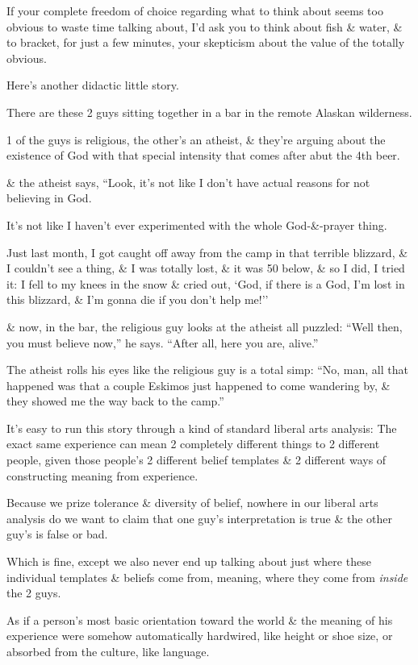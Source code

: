\documentclass{article}
\numberwithin{equation}{section}
\begin{document}
If your complete freedom of choice regarding what to think about seems too obvious to waste time talking about, I'd ask you to think about fish \& water, \& to bracket, for just a few minutes, your skepticism about the value of the totally obvious.

Here's another didactic little story.

There are these 2 guys sitting together in a bar in the remote Alaskan wilderness.

1 of the guys is religious, the other's an atheist, \& they're arguing about the existence of God with that special intensity that comes after abut the 4th beer.

\& the atheist says, ``Look, it's not like I don't have actual reasons for not believing in God.

It's not like I haven't ever experimented with the whole God-\&-prayer thing.

Just last month, I got caught off away from the camp in that terrible blizzard, \& I couldn't see a thing, \& I was totally lost, \& it was 50 below, \& so I did, I tried it: I fell to my knees in the snow \& cried out, `God, if there is a God, I'm lost in this blizzard, \& I'm gonna die if you don't help me!''

\& now, in the bar, the religious guy looks at the atheist all puzzled: ``Well then, you must believe now,'' he says. ``After all, here you are, alive.''

The atheist rolls his eyes like the religious guy is a total simp: ``No, man, all that happened was that a couple Eskimos just happened to come wandering by, \& they showed me the way back to the camp.''

It's easy to run this story through a kind of standard liberal arts analysis: The exact same experience can mean 2 completely different things to 2 different people, given those people's 2 different belief templates \& 2 different ways of constructing meaning from experience.

Because we prize tolerance \& diversity of belief, nowhere in our liberal arts analysis do we want to claim that one guy's interpretation is true \& the other guy's is false or bad.

Which is fine, except we also never end up talking about just where these individual templates \& beliefs come from, meaning, where they come from \textit{inside} the 2 guys.

As if a person's most basic orientation toward the world \& the meaning of his experience were somehow automatically hardwired, like height or shoe size, or absorbed from the culture, like language.
\end{document}
